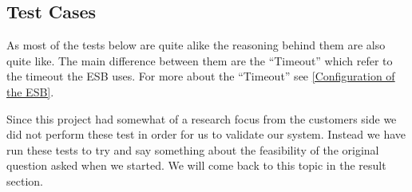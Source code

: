 	\subsection{Test Cases}\label{Testing:Cases}

	As most of the tests below are quite alike the reasoning behind them are also quite like. The main difference between them are the “Timeout” which refer to the timeout the ESB uses. For more about the “Timeout” see \ref{Configuration of the ESB}.

	Since this project had somewhat of a research focus from the customers side we did not perform these test in order for us to validate our system. Instead we have run these tests to try and say something about the feasibility of the original question asked when we started. We will come back to this topic in the result section.\\
    

